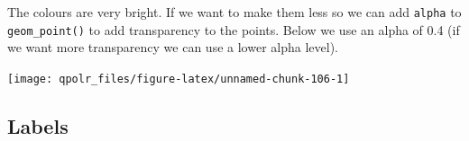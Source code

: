 \documentclass[12pt,oneside]{reedthesis}
\theoremstyle{definition}
\theoremstyle{definition}
\theoremstyle{definition}
\theoremstyle{remark}
\begin{document}
  The colours are very bright. If we want to make them less so we can add
  \texttt{alpha} to \texttt{geom\_point()} to add transparency to the
  points. Below we use an alpha of 0.4 (if we want more transparency we
  can use a lower alpha level).
  \begin{Shaded}
  \begin{Highlighting}[]
  \NormalTok{(}\OperatorTok{+}
  \StringTok{  }\NormalTok{(} \NormalTok{, }\NormalTok{) }\OperatorTok{+}\StringTok{ }
  \StringTok{  }\NormalTok{(}\NormalTok{, }\NormalTok{) }\OperatorTok{+}
  \StringTok{  }\NormalTok{(} \NormalTok{(}\NormalTok{, }\NormalTok{)) }\OperatorTok{+}
  \StringTok{  }\NormalTok{()}
  \end{Highlighting}
  \end{Shaded}
  \begin{center}\texttt{[image: qpolr\_files/figure-latex/unnamed-chunk-106-1]} \end{center}
  
  \subsection{Labels}\label{labels}
  
\end{document}
